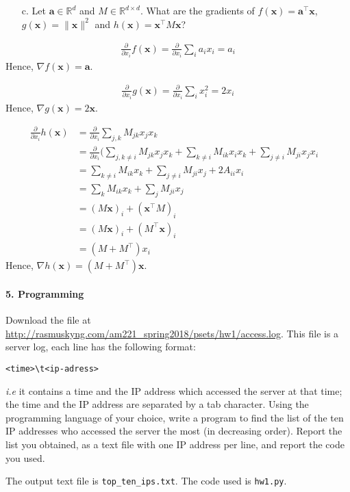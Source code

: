 \documentclass[11pt]{article}
\newcommand{\R}{\mathbb{R}}                     %
\newcommand{\bx}{\mathbf{x}}
\newcommand{\ba}{\mathbf{a}}
\begin{document}
\begin{itemize}
\item[c.] Let $\ba\in\R^d$ and $M\in\R^{d\times d}$. What are the gradients
of $f(\bx) = \ba^\intercal \bx$, $g(\bx) = \|\bx\|^2$ and $h(\bx)
= \bx^\intercal M\bx$?
\end{itemize}

\color{blue}
\begin{align*}
\frac{\partial}{\partial x_i}f(\bx)=\frac{\partial}{\partial x_i}\sum_i a_ix_i=a_i
\end{align*}
Hence, $\nabla f(\bx)=\ba$.

\begin{align*}
\frac{\partial}{\partial x_i}g(\bx)=\frac{\partial}{\partial x_i}\sum_i x_i^2=2x_i
\end{align*}
Hence, $\nabla g(\bx)=2\bx$.

\begin{align*}
\frac{\partial}{\partial x_i}h(\bx)&=\frac{\partial}{\partial x_i}\sum_{j,k} M_{jk}x_jx_k &\\
&= \frac{\partial}{\partial x_i}(\sum_{j,k\neq i} M_{jk}x_jx_k + \sum_{k\neq i} M_{ik}x_ix_k + \sum_{j\neq i} M_{ji}x_jx_i &\\
&= \sum_{k\neq i}M_{ik}x_k + \sum_{j\neq i}M_{ji}x_j + 2A_{ii}x_i &\\
&= \sum_k M_{ik}x_k + \sum_j M_{ji}x_j &\\
&= (M\bx)_i+(\bx^\intercal M)_i &\\
&= (M\bx)_i+(M^\intercal \bx)_i &\\
&= (M+M^\intercal )x_i
\end{align*}
Hence, $\nabla h(\bx)=(M+M^\intercal )\bx$.
\color{black}

\paragraph{5. Programming}

Download the file at \url{http://rasmuskyng.com/am221_spring2018/psets/hw1/access.log}. This file is
a server log, each line has the following format:
\begin{center}
    \begin{verbatim}<time>\t<ip-adress>\end{verbatim}
\end{center}
\emph{i.e} it contains a time and the IP address which accessed the server at
that time; the time and the IP address are separated by a tab character. Using
the programming language of your choice, write a program to find the list of
the ten IP addresses who accessed the server the most (in decreasing order). 
Report the list you obtained, as a text file with one IP address
per line, and report the code you used.

\color{blue}
The output text file is \verb|top_ten_ips.txt|. The code used is \verb|hw1.py|.
\color{black}
\end{document}
